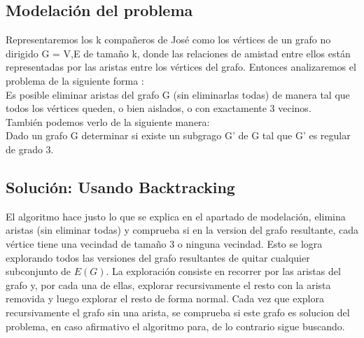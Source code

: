 \documentclass[
10pt, %
a4paper, %
oneside, %
headinclude,footinclude, %
BCOR5mm, %
]{scrartcl}
\begin{document}




\subsection{Modelación del problema}

Representaremos los k compañeros de José como los vértices de un grafo no dirigido G = {V,E} de tamaño k, donde las relaciones de amistad entre ellos están representadas
por las aristas entre los vértices del grafo. Entonces analizaremos el problema de la siguiente forma :\\

Es posible eliminar aristas del grafo G (sin eliminarlas todas) de manera tal que todos los vértices queden, o bien aislados, o con exactamente 3 vecinos. \\

También podemos verlo de la siguiente manera: \\

Dado un grafo G determinar si existe un subgrago G' de G tal que G' es regular de grado 3.\\


\subsection{Solución: Usando Backtracking}

El algoritmo hace justo lo que se explica en el apartado de modelación, elimina aristas (sin eliminar todas) y comprueba si
en la version del grafo resultante, cada vértice tiene una vecindad de tamaño 3 o ninguna vecindad. Esto se logra explorando
todos las versiones del grafo resultantes de quitar cualquier subconjunto de $E(G)$. La exploración consiste en recorrer por
las aristas del grafo y, por cada una de ellas, explorar recursivamente el resto con la arista removida y luego explorar el resto
de forma normal. Cada vez que explora recursivamente el grafo sin una arista, se comprueba si este grafo es solucion del problema,
en caso afirmativo el algoritmo para, de lo contrario sigue buscando.
\end{document}
